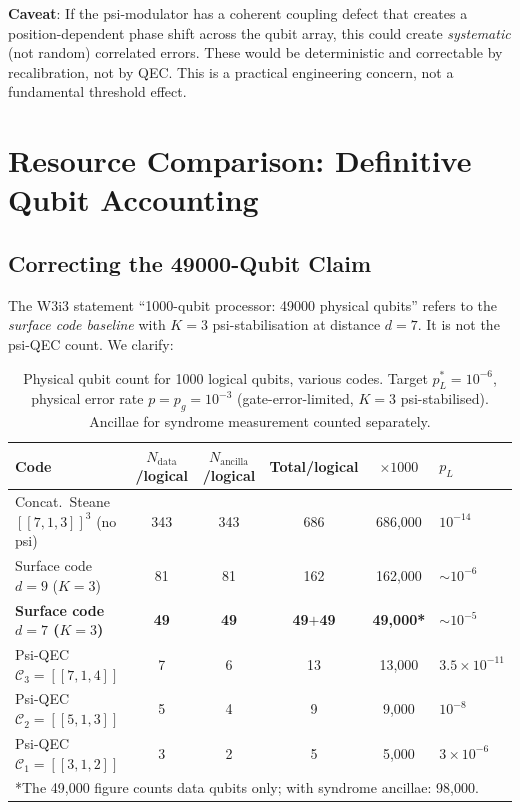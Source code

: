 \documentclass[11pt]{article}
\theoremstyle{definition}
\theoremstyle{remark}
\begin{document}
\textbf{Caveat}: If the psi-modulator has a coherent coupling defect that
creates a position-dependent phase shift across the qubit array, this could
create \emph{systematic} (not random) correlated errors.  These would be
deterministic and correctable by recalibration, not by QEC.  This is a
practical engineering concern, not a fundamental threshold effect.

\section{Resource Comparison: Definitive Qubit Accounting}
\label{sec:resources}

\subsection{Correcting the 49000-Qubit Claim}
\label{sec:49000}

The W3i3 statement ``1000-qubit processor: 49000 physical qubits'' refers to
the \emph{surface code baseline} with $K=3$ psi-stabilisation at distance $d=7$.
It is not the psi-QEC count.  We clarify:

\begin{table}[h]
\centering
\caption{Physical qubit count for 1000 logical qubits, various codes.
  Target $p_L^* = 10^{-6}$, physical error rate $p = p_g = 10^{-3}$
  (gate-error-limited, $K=3$ psi-stabilised).  Ancillae for syndrome
  measurement counted separately.}
\label{tab:qubit-count}
\begin{tabular}{@{}lccccl@{}}
\toprule
Code & $N_{\mathrm{data}}$/logical & $N_{\mathrm{ancilla}}$/logical & Total/logical
     & $\times1000$ & $p_L$ \\
\midrule
Concat.\ Steane $[[7,1,3]]^3$ (no psi) & 343 & 343 & 686 & 686,000 & $10^{-14}$ \\
Surface code $d=9$ ($K=3$) & 81 & 81 & 162 & 162,000 & $\sim10^{-6}$ \\
\textbf{Surface code $d=7$ ($K=3$)} & \textbf{49} & \textbf{49} & \textbf{49$+$49} & \textbf{49,000*} & $\sim10^{-5}$ \\
Psi-QEC $\mathcal{C}_3 = [[7,1,4]]$ & 7 & 6 & 13 & 13,000 & $3.5\times10^{-11}$ \\
Psi-QEC $\mathcal{C}_2 = [[5,1,3]]$ & 5 & 4 & 9 & 9,000 & $10^{-8}$ \\
Psi-QEC $\mathcal{C}_1 = [[3,1,2]]$ & 3 & 2 & 5 & 5,000 & $3\times10^{-6}$ \\
\bottomrule
\multicolumn{6}{l}{*The 49,000 figure counts data qubits only; with syndrome ancillae: 98,000.}
\end{tabular}
\end{table}
\end{document}
